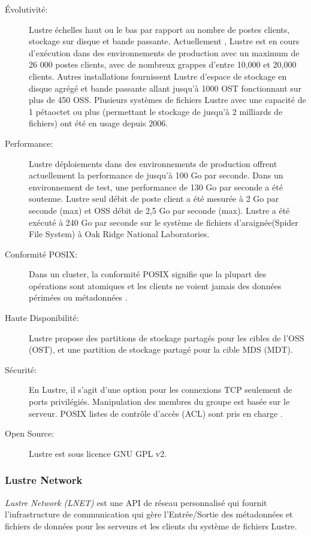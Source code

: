 \documentclass[12pt]{article}
\begin{document}
\begin{description}

\item[Évolutivité: ]
 Lustre échelles haut ou le bas par rapport au nombre de postes clients, stockage sur disque et bande passante. Actuellement , Lustre est en cours d'exécution dans des environnements de production avec un maximum de 26 000 postes clients, avec de nombreux grappes d'entre 10,000 et 20,000 clients. Autres installations fournissent Lustre d'espace de stockage en disque agrégé et bande passante allant jusqu'à 1000 OST fonctionnant sur plus de 450 OSS. Plusieurs systèmes de fichiers Lustre avec une capacité de 1 pétaoctet ou plus (permettant le stockage de jusqu'à 2 milliards de fichiers) ont été en usage depuis 2006.
\item[Performance: ]
 Lustre déploiements dans des environnements de production offrent actuellement la performance de jusqu'à 100 Go par seconde. Dans un environnement de test, une performance de 130 Go par seconde a été soutenue. Lustre seul débit de poste client a été mesurée à 2 Go par seconde (max) et OSS débit de 2,5 Go par seconde (max). Lustre a été exécuté à 240 Go par seconde sur le système de fichiers d'araignée(Spider File System) à Oak Ridge National Laboratories.

\item[Conformité POSIX:]Dans un cluster, la conformité POSIX signifie que la plupart des opérations sont atomiques et les clients ne voient jamais des données périmées ou métadonnées .
\item[Haute Disponibilité:]Lustre propose des partitions de stockage partagés pour les cibles de l'OSS (OST), et une partition de stockage partagé pour la cible MDS (MDT).

\item[Sécurité:]En Lustre, il s'agit d'une option pour les connexions TCP seulement de ports privilégiés. Manipulation des membres du groupe est basée sur le serveur. POSIX listes de contrôle d'accès (ACL) sont pris en charge .
\item[Open Source:] Lustre est sous licence GNU GPL v2.
\item[]
\end{description}
\subsubsection{Lustre Network}

\textit{Lustre Network (LNET)} est une API de réseau personnalisé qui fournit l'infrastructure de communication qui gère l'Entrée/Sortie des métadonnées et fichiers de données pour les serveurs et les clients du système de fichiers Lustre.
\end{document}
